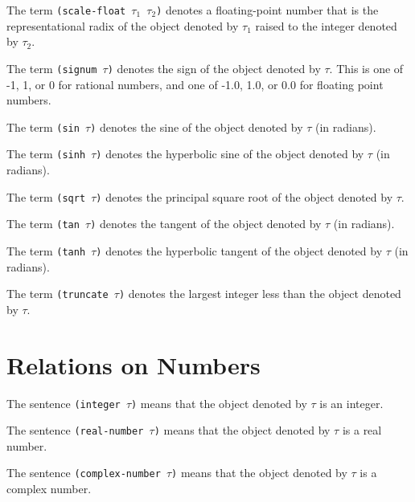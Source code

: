 {The term {\tt (scale-float $\tau_1$ $\tau_2$)} denotes a floating-point
number that is the representational radix of the object denoted by
$\tau_1$ raised to the integer  denoted by $\tau_2$.}



{The term {\tt (signum $\tau$)} denotes the sign of the object denoted by $\tau$. This is one of -1,
1, or 0 for rational numbers, and one of -1.0, 1.0, or 0.0 for floating point numbers.}



{The term {\tt (sin $\tau$)} denotes the sine of the object denoted by $\tau$ (in radians).}



{The term {\tt (sinh $\tau$)} denotes the hyperbolic sine of the object denoted by $\tau$ (in radians).}



{The term {\tt (sqrt $\tau$)} denotes the principal square root of the object denoted by $\tau$.}



{The term {\tt (tan $\tau$)} denotes the tangent of the object denoted by $\tau$ (in radians).}



{The term {\tt (tanh $\tau$)} denotes the hyperbolic tangent of the object denoted by
$\tau$ (in radians).}



{The term {\tt (truncate $\tau$)} denotes the largest integer less than the object denoted
by $\tau$.}

\section{Relations on Numbers}

The sentence {\tt (integer $\tau$)} means that the object denoted by
$\tau$ is an integer.

The sentence {\tt (real-number $\tau$)} means that the object denoted by
$\tau$ is a real number.

The sentence {\tt (complex-number $\tau$)} means that the object denoted by
$\tau$ is a complex number.

